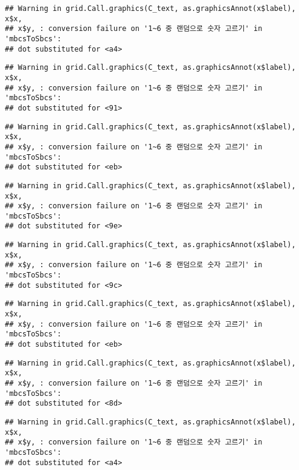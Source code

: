 \documentclass[]{book}
\begin{document}
\begin{verbatim}
## Warning in grid.Call.graphics(C_text, as.graphicsAnnot(x$label), x$x,
## x$y, : conversion failure on '1~6 중 랜덤으로 숫자 고르기' in 'mbcsToSbcs':
## dot substituted for <a4>
\end{verbatim}

\begin{verbatim}
## Warning in grid.Call.graphics(C_text, as.graphicsAnnot(x$label), x$x,
## x$y, : conversion failure on '1~6 중 랜덤으로 숫자 고르기' in 'mbcsToSbcs':
## dot substituted for <91>
\end{verbatim}

\begin{verbatim}
## Warning in grid.Call.graphics(C_text, as.graphicsAnnot(x$label), x$x,
## x$y, : conversion failure on '1~6 중 랜덤으로 숫자 고르기' in 'mbcsToSbcs':
## dot substituted for <eb>
\end{verbatim}

\begin{verbatim}
## Warning in grid.Call.graphics(C_text, as.graphicsAnnot(x$label), x$x,
## x$y, : conversion failure on '1~6 중 랜덤으로 숫자 고르기' in 'mbcsToSbcs':
## dot substituted for <9e>
\end{verbatim}

\begin{verbatim}
## Warning in grid.Call.graphics(C_text, as.graphicsAnnot(x$label), x$x,
## x$y, : conversion failure on '1~6 중 랜덤으로 숫자 고르기' in 'mbcsToSbcs':
## dot substituted for <9c>
\end{verbatim}

\begin{verbatim}
## Warning in grid.Call.graphics(C_text, as.graphicsAnnot(x$label), x$x,
## x$y, : conversion failure on '1~6 중 랜덤으로 숫자 고르기' in 'mbcsToSbcs':
## dot substituted for <eb>
\end{verbatim}

\begin{verbatim}
## Warning in grid.Call.graphics(C_text, as.graphicsAnnot(x$label), x$x,
## x$y, : conversion failure on '1~6 중 랜덤으로 숫자 고르기' in 'mbcsToSbcs':
## dot substituted for <8d>
\end{verbatim}

\begin{verbatim}
## Warning in grid.Call.graphics(C_text, as.graphicsAnnot(x$label), x$x,
## x$y, : conversion failure on '1~6 중 랜덤으로 숫자 고르기' in 'mbcsToSbcs':
## dot substituted for <a4>
\end{verbatim}
\end{document}
